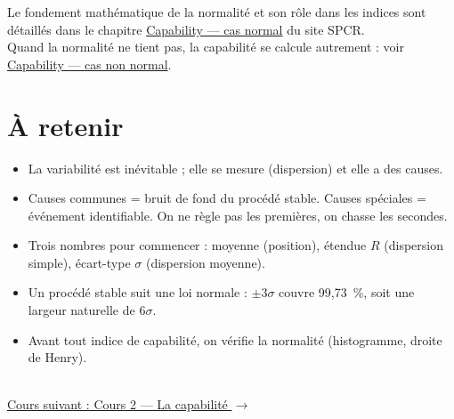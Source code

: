 \documentclass[11pt]{article}
\begin{document}

\begin{plusloin}
Le fondement mathématique de la normalité et son rôle dans les indices sont détaillés dans le chapitre \href{https://sjaubert.github.io/SPCR/capability.html}{Capability — cas normal} du site SPCR.\\[3pt]
Quand la normalité ne tient pas, la capabilité se calcule autrement : voir \href{https://sjaubert.github.io/SPCR/Capability_non_normal_data.html}{Capability — cas non normal}.
\end{plusloin}

\section*{\color{uimmblue}À retenir}
\begin{itemize}
\item La variabilité est inévitable ; elle se mesure (dispersion) et elle a des causes.
\item Causes communes = bruit de fond du procédé stable. Causes spéciales = événement identifiable. On ne règle pas les premières, on chasse les secondes.
\item Trois nombres pour commencer : moyenne (position), étendue $R$ (dispersion simple), écart-type $\sigma$ (dispersion moyenne).
\item Un procédé stable suit une loi normale : $\pm 3\sigma$ couvre 99,73~\%, soit une largeur naturelle de $6\sigma$.
\item Avant tout indice de capabilité, on vérifie la normalité (histogramme, droite de Henry).
\end{itemize}

\vfill
\noindent\hrulefill\\[2pt]
{\footnotesize\color{uimmgrey}\href{2_La_Capabilite.pdf}{Cours suivant : Cours 2 — La capabilité $\rightarrow$}}
\end{document}
